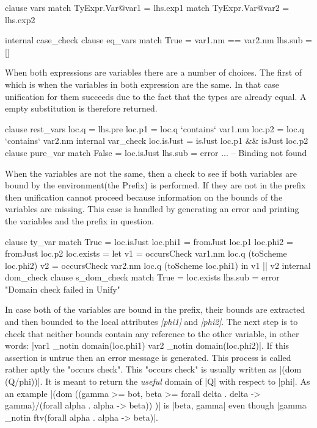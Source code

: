 \begin{code}
clause vars
  match TyExpr.Var@var1 = lhs.exp1
  match TyExpr.Var@var2 = lhs.exp2
  
  internal case_check
    clause eq_vars
      match True = var1.nm == var2.nm
      lhs.sub = []
\end{code}
When both expressions are variables there are a number of choices. The first of which is when the variables in both expression are the same. In that case unification for them succeeds due to the fact that the types are already equal. A empty substitution is therefore returned.

\begin{code}
clause rest_vars
  loc.q  = lhs.pre
  loc.p1 = loc.q `contains` var1.nm
  loc.p2 = loc.q `contains` var2.nm
  internal var_check
    loc.isJust    = isJust loc.p1 && isJust loc.p2
    clause pure_var
      match False = loc.isJust
      lhs.sub = error ... -- Binding not found
\end{code}
When the variables are not the same, then a check to see if both variables are bound by the environment(the Prefix) is performed. If they are not in the prefix then unification cannot proceed because information on the bounds of the variables are missing. This case is handled by generating an error and printing the variables and the prefix in question.

\begin{code} 
clause ty_var
  match True  = loc.isJust
  loc.phi1 = fromJust loc.p1
  loc.phi2 = fromJust loc.p2
  loc.exists =  let  v1  = occursCheck var1.nm loc.q (toScheme loc.phi2)
                     v2  = occursCheck var2.nm loc.q (toScheme loc.phi1)
                in v1 || v2
  internal dom_check
    clause s_dom_check
      match True  = loc.exists
      lhs.sub     = error "Domain check failed in Unify"
\end{code}
In case both of the variables are bound in the prefix, their bounds are extracted and then bounded to the local attributes \emph{|phi1|} and \emph{|phi2|}. The next step is to check that neither bounds contain any reference to the other variable, in other words: |var1 _notin domain(loc.phi1) \cap var2 _notin domain(loc.phi2)|. If this assertion is untrue then an error message is generated. This process is called rather aptly the "occurs check".
This "occurs check" is usually written as |(dom (Q/phi))|. It is meant to return the \emph{useful} domain of |Q| with respect to |phi|\cite{HML}. As an example |(dom ((gamma >= bot, beta >= forall delta . delta -> gamma)/(forall alpha . alpha -> beta)) )| is |{beta, gamma}| even though |gamma _notin ftv(forall alpha . alpha -> beta)|. 

